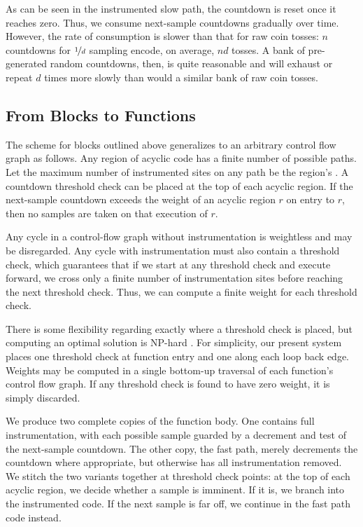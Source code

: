 As can be seen in the instrumented slow path, the countdown is reset
once it reaches zero.  Thus, we consume next-sample countdowns
gradually over time.  However, the rate of consumption is slower than
that for raw coin tosses: $n$ countdowns for $\nicefrac{1}{d}$
sampling encode, on average, $nd$ tosses.  A bank of pre-generated
random countdowns, then, is quite reasonable and will exhaust or
repeat $d$ times more slowly than would a similar bank of raw coin
tosses.

\subsection{From Blocks to Functions}

The scheme for blocks outlined above generalizes to an arbitrary
control flow graph as follows.  Any region of acyclic code has a
finite number of possible paths.  Let the maximum number of
instrumented sites on any path be the region's .
A countdown threshold check can be placed at the top of each acyclic
region.  If the next-sample countdown exceeds the weight of an 
acyclic region $r$ on entry to $r$,
then no samples are taken on that execution of $r$.

Any cycle in a control-flow graph without instrumentation is
weightless and may be disregarded.  Any cycle with
instrumentation must also contain a threshold check, which guarantees
that if we start at any threshold check and execute forward, we cross
only a finite number of instrumentation sites before reaching the next
threshold check.  Thus, we can compute a finite weight for each
threshold check.

There is some flexibility regarding exactly where a threshold check is
placed, but computing an optimal solution is NP-hard
\cite{Hirzel:2001:BT-FLOTP}.  For simplicity, our present system
places one threshold check at function entry and one along each loop
back edge.  Weights may be computed in a single bottom-up traversal of
each function's control flow graph.  If any threshold check is found
to have zero weight, it is simply discarded.

We produce two complete copies of the function body.  One contains
full instrumentation, with each possible sample guarded by a decrement
and test of the next-sample countdown.  The other copy, the fast path,
merely decrements the countdown where appropriate, but otherwise has
all instrumentation removed.  We stitch the two variants together at
threshold check points: at the top of each acyclic region, we decide
whether a sample is imminent.  If it is, we branch into the
instrumented code.  If the next sample is far off, we continue in the
fast path code instead.


